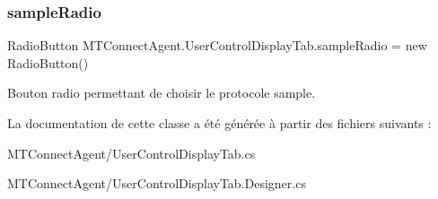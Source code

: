 \subsubsection{\texorpdfstring{sample\+Radio}{sampleRadio}}
{\footnotesize\ttfamily Radio\+Button M\+T\+Connect\+Agent.\+User\+Control\+Display\+Tab.\+sample\+Radio = new Radio\+Button()\hspace{0.3cm}{\ttfamily [private]}}



Bouton radio permettant de choisir le protocole sample. 



La documentation de cette classe a été générée à partir des fichiers suivants \+:\begin{DoxyCompactItemize}
\item 
M\+T\+Connect\+Agent/User\+Control\+Display\+Tab.\+cs\item 
M\+T\+Connect\+Agent/User\+Control\+Display\+Tab.\+Designer.\+cs\end{DoxyCompactItemize}
